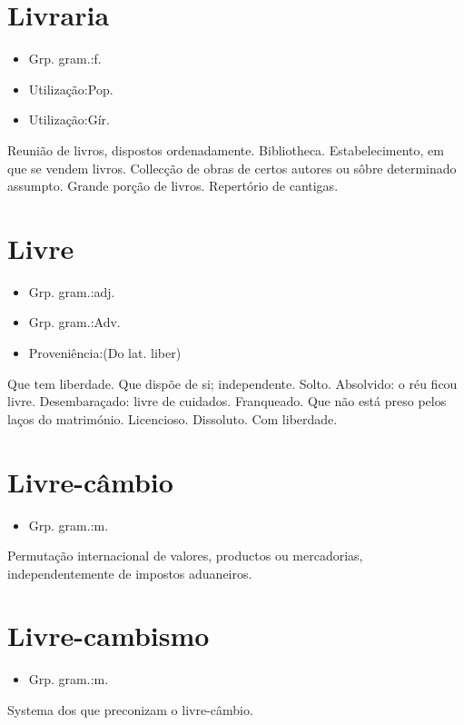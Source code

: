 \section{Livraria}
\begin{itemize}
\item {Grp. gram.:f.}
\end{itemize}
\begin{itemize}
\item {Utilização:Pop.}
\end{itemize}
\begin{itemize}
\item {Utilização:Gír.}
\end{itemize}
Reunião de livros, dispostos ordenadamente.
Bibliotheca.
Estabelecimento, em que se vendem livros.
Collecção de obras de certos autores ou sôbre determinado assumpto.
Grande porção de livros.
Repertório de cantigas.
\section{Livre}
\begin{itemize}
\item {Grp. gram.:adj.}
\end{itemize}
\begin{itemize}
\item {Grp. gram.:Adv.}
\end{itemize}
\begin{itemize}
\item {Proveniência:(Do lat. \textunderscore liber\textunderscore )}
\end{itemize}
Que tem liberdade.
Que dispõe de si; independente.
Solto.
Absolvido: \textunderscore o réu ficou livre\textunderscore .
Desembaraçado: \textunderscore livre de cuidados\textunderscore .
Franqueado.
Que não está preso pelos laços do matrimónio.
Licencioso.
Dissoluto.
Com liberdade.
\section{Livre-câmbio}
\begin{itemize}
\item {Grp. gram.:m.}
\end{itemize}
Permutação internacional de valores, productos ou mercadorias, independentemente de impostos aduaneiros.
\section{Livre-cambismo}
\begin{itemize}
\item {Grp. gram.:m.}
\end{itemize}
Systema dos que preconizam o livre-câmbio.
